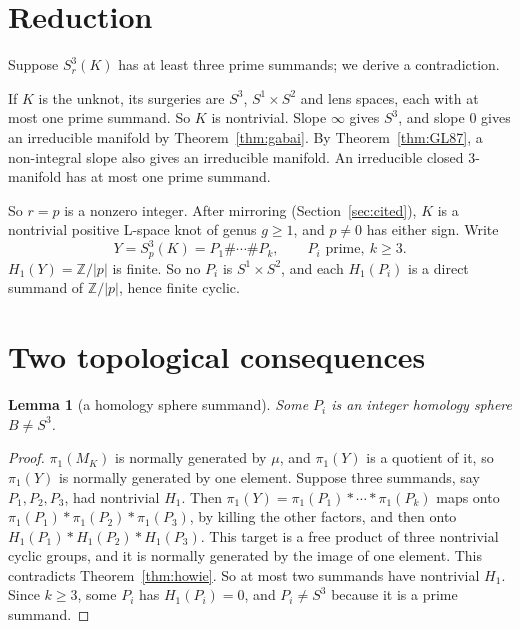 \documentclass[11pt]{article}
\newtheorem{lemma}[theorem]{Lemma}
\theoremstyle{definition}
\newcommand{\Z}{\mathbb{Z}}
\begin{document}
\section{Reduction}\label{sec:reduction}

Suppose $S^3_r(K)$ has at least three prime summands; we derive a contradiction.

If $K$ is the unknot, its surgeries are $S^3$, $S^1\times S^2$ and lens spaces, each with at most one prime summand. So $K$ is nontrivial. Slope $\infty$ gives $S^3$, and slope $0$ gives an irreducible manifold by Theorem~\ref{thm:gabai}. By Theorem~\ref{thm:GL87}, a non-integral slope also gives an irreducible manifold. An irreducible closed $3$-manifold has at most one prime summand.

So $r=p$ is a nonzero integer. After mirroring (Section~\ref{sec:cited}), $K$ is a nontrivial positive L-space knot of genus $g\ge1$, and $p\ne0$ has either sign. Write
\[
Y=S^3_p(K)=P_1\#\cdots\#P_k,\qquad P_i \text{ prime},\ k\ge3.
\]
$H_1(Y)=\Z/|p|$ is finite. So no $P_i$ is $S^1\times S^2$, and each $H_1(P_i)$ is a direct summand of $\Z/|p|$, hence finite cyclic.

\section{Two topological consequences}\label{sec:topo}
\begin{lemma}[a homology sphere summand]\label{lem:hs}
Some $P_i$ is an integer homology sphere $B\ne S^3$.
\end{lemma}

\begin{proof}
$\pi_1(M_K)$ is normally generated by $\mu$, and $\pi_1(Y)$ is a quotient of it, so $\pi_1(Y)$ is normally generated by one element. Suppose three summands, say $P_1,P_2,P_3$, had nontrivial $H_1$. Then $\pi_1(Y)=\pi_1(P_1)*\cdots*\pi_1(P_k)$ maps onto $\pi_1(P_1)*\pi_1(P_2)*\pi_1(P_3)$, by killing the other factors, and then onto $H_1(P_1)*H_1(P_2)*H_1(P_3)$. This target is a free product of three nontrivial cyclic groups, and it is normally generated by the image of one element. This contradicts Theorem~\ref{thm:howie}. So at most two summands have nontrivial $H_1$. Since $k\ge3$, some $P_i$ has $H_1(P_i)=0$, and $P_i\ne S^3$ because it is a prime summand.
\end{proof}
\end{document}
